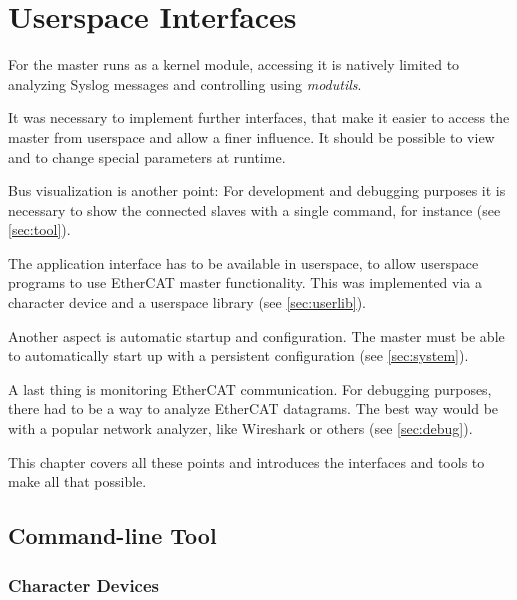 \documentclass[a4paper,12pt,BCOR6mm,bibtotoc,idxtotoc]{scrbook}
\begin{document}

\chapter{Userspace Interfaces}
\label{sec:user}

For the master runs as a kernel module, accessing it is natively limited to
analyzing Syslog messages and controlling using \textit{modutils}.

It was necessary to implement further interfaces, that make it easier to access
the master from userspace and allow a finer influence. It should be possible
to view and to change special parameters at runtime.

Bus visualization is another point: For development and debugging purposes it
is necessary to show the connected slaves with a single command, for instance
(see \autoref{sec:tool}).

The application interface has to be available in userspace, to allow userspace
programs to use EtherCAT master functionality. This was implemented via a
character device and a userspace library (see \autoref{sec:userlib}).

Another aspect is automatic startup and configuration. The master must be able
to automatically start up with a persistent configuration (see
\autoref{sec:system}).

A last thing is monitoring EtherCAT communication. For debugging purposes,
there had to be a way to analyze EtherCAT datagrams. The best way would be
with a popular network analyzer, like Wireshark \cite{wireshark} or others
(see \autoref{sec:debug}).

This chapter covers all these points and introduces the interfaces and tools
to make all that possible.


\section{Command-line Tool}
\label{sec:tool}


\subsection{Character Devices}
\label{sec:cdev}
\end{document}
